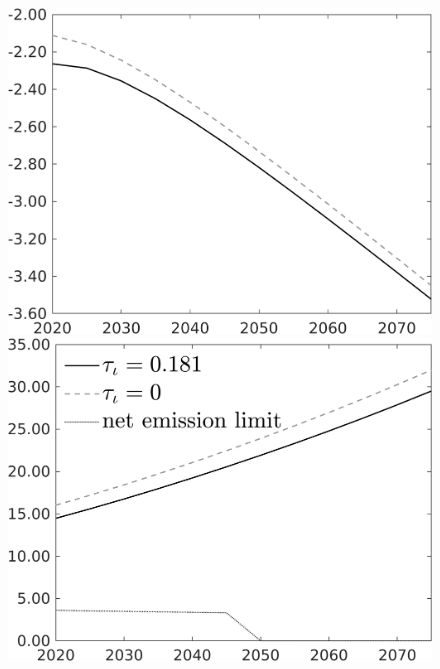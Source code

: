 \begin{figure}[h!!]
\begin{minipage}[]{0.32\textwidth}
\end{minipage}		
\begin{minipage}[]{0.32\textwidth}
\includegraphics[width=1\textwidth]{../../codding_model/own_basedOnFried/optimalPol_010922_revision/figures/all_13Sept22/PerdifNoTauf_regime0_CompTaul_C_spillover0_nsk0_xgr0_sep1_LFlimit0_emsbase1_countec0_GovRev1_etaa0.79_lgd0.png}
\end{minipage}	
\begin{minipage}[]{0.32\textwidth}
	\includegraphics[width=1\textwidth]{../../codding_model/own_basedOnFried/optimalPol_010922_revision/figures/all_13Sept22/CompTaul_Reg0_Emnet_spillover0_nsk0_xgr0_sep1_LFlimit0_emsbase1_countec0_GovRev1_etaa0.79_lgd1.png}
\end{minipage}	
\end{figure}


